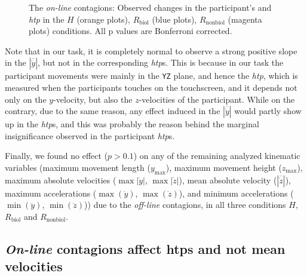 \begin{figure}[t]
	\caption{The \textit{on-line} contagions: Observed changes in the participant's  and \textit{htp} in the $\textit{H}$ (orange plots), $\textit{R}_{\text{biol}}$ (blue plots), $\textit{R}_{\text{nonbiol}}$ (magenta plots) conditions. All p values are Bonferroni corrected.}
	\label{fig:online}
\end{figure}

Note that in our task, it is completely normal to observe a strong positive slope in the $|\overline{\dot{y}}|$, but not in the corresponding {\it htp}s. This is because in our task the participant movements were mainly in the \texttt{YZ} plane, and hence the {\it htp}, which is measured when the participants touches on the touchscreen, and it depends not only on the $y$-velocity, but also the $z$-velocities of the participant. While on the contrary, due to the same reason, any effect induced in the $|\overline{\dot{y}}|$ would partly show up in the {\it htp}s, and this was probably the reason behind the marginal insignificance observed in the participant {\it htp}s.

Finally, we found no effect ($p > 0.1$) on any of the remaining analyzed kinematic variables (maximum movement length ($y_{\max}$), maximum movement height ($z_{\max}$), maximum absolute velocities ($\max|\dot{y}|$, $\max|\dot{z}|$), mean absolute velocity ($|\overline{\dot{z}}|$), maximum accelerations ($\max(\ddot{y})$, $\max(\ddot{z})$), and minimum accelerations ($\min(\ddot{y})$, $\min(\ddot{z})$)) due to the \textit{off-line} contagions, in all three conditions $H$, $R_{\text{biol}}$ and $R_{\text{nonbiol}}$.

\subsection{\textit{On-line} contagions affect htps and not mean velocities}

